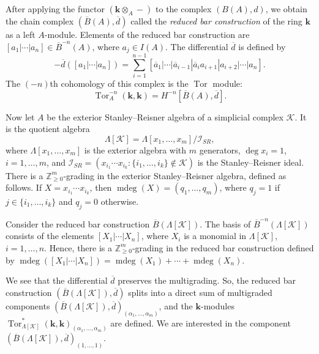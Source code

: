 \documentclass[a4paper,12pt]{amsart}
\newcommand{\K}{\mathcal K}
\newcommand{\ZZ}{\mathbb Z}
\renewcommand{\ge}{\geqslant}
\newcommand{\kk}{\mathbf{k}}
\theoremstyle{definition}
\theoremstyle{remark}
\numberwithin{equation}{section}
\DeclareMathOperator{\Tor}{Tor}
\DeclareMathOperator{\mdeg}{mdeg}
\begin{document}
After applying the functor $(\kk \otimes_A - )$ to the complex $(B(A), d)$, we obtain the chain complex $(\overline B (A) , \overline d )$ called
the \textit{reduced bar construction} of the ring $\kk$ as a left $A$-module. 
Elements of the reduced bar construction are $[a_1 | \cdots | a_n] \in \overline{B}^{-n}(A)$, where $a_j \in I(A)$. 
The differential $\overline d$ is defined by
\[
  -\overline d ([a_1 | \cdots | a_n]) = \sum_{i = 1}^{n-1} [\overline{a}_1 | \cdots | \overline{a}_{i-1} | \overline{a}_i a_{i+1} | a_{i+2} | \cdots | a_n].
\] 
The $(-n)$th cohomology of this complex is the $\Tor$ module:
\[
  \Tor_A^{-n}(\kk, \kk) = H^{-n}[\overline B (A), \overline d].
\]  
 
Now let $A$ be the exterior Stanley--Reisner algebra of a simplicial complex $\K$. It is the quotient algebra
\[
  \Lambda[\K] = \Lambda[x_1, \ldots, x_m] / \mathcal{I}_{SR},
\]  
where $\Lambda[x_1, \ldots, x_m]$ is the exterior algebra with $m$ generators, $\deg x_i = 1$, $i = 1, \ldots, m$, and
$\mathcal{I}_{SR} = (x_{i_1} \cdots x_{i_k}\colon \{i_1, \ldots, i_k \} \notin \K)$ %
is the Stanley--Reisner ideal.
There is a $\ZZ_{\ge 0}^m$-grading in the exterior Stanley--Reisner algebra, defined as follows. If $X = x_{i_1} \cdots x_{i_k}$,
then $\mdeg(X) = ( q_1, \ldots, q_m )$, where $q_j = 1$ if $j \in \{i_1, \ldots, i_k \}$ and $q_j = 0$ otherwise.

Consider the reduced bar construction $\overline{B}(\Lambda[\K])$. 
The basis of $\overline{B}^{-n}(\Lambda[\K])$ consists of the elements $[X_1 | \cdots | X_n]$,
where $X_i$ is a monomial in $\Lambda[\K]$, $i = 1, \ldots, n$. 
Hence, there is a $\ZZ_{\ge 0}^m$-grading in the reduced bar construction defined by $\mdeg([X_1 | \cdots | X_n]) = \mdeg(X_1) + \cdots + \mdeg(X_n)$.

We see that the differential $\overline{d}$ preserves the multigrading.
So, the reduced bar construction $(\overline{B}(\Lambda[\K]), \overline d)$ splits into a direct sum of multigraded components $(\overline{B}(\Lambda[\K]), \overline d)_{ (\alpha_1, \ldots, \alpha_m ) }$,
and the $\kk$-modules
$\Tor_{\Lambda[\K]}^*(\kk, \kk)_{(\alpha_1, \ldots, \alpha_m )}$ are defined. 
We are interested in the component $(\overline{B}(\Lambda[\K]),\overline{d})_{(1, \ldots, 1 )}$.
\end{document}
